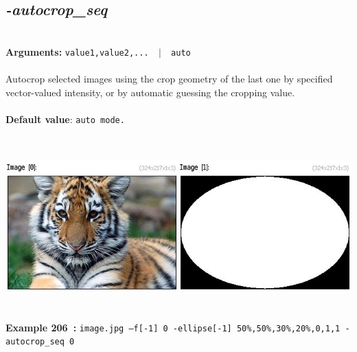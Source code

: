 \documentclass[a4paper,11pt,twoside]{book}
\begin{document}
\subsection{\emph{-autocrop\_seq} }\vspace*{-0.5em}
~\\\textbf{Arguments: } 
{\small \texttt{value1,value2,... ~$|$~ auto}}\\~\\
Autocrop selected images using the crop geometry of the last one by specified vector-valued intensity,
or by automatic guessing the cropping value.
~\\~\\\textbf{Default value}: {\small \texttt{auto mode.}}
\begin{center}\includegraphics[keepaspectratio=true,height=7cm,width=\textwidth]{img/gmic_def206.jpg}\\
{\footnotesize \textbf{Example 206~:} \texttt{image.jpg --f[-1] 0 -ellipse[-1] 50\%,50\%,30\%,20\%,0,1,1 -autocrop\_seq 0}}
\end{center}
\end{document}
